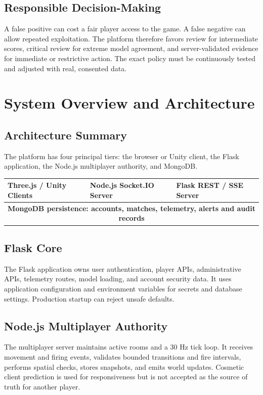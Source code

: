 \documentclass[12pt,a4paper,oneside]{report}
\begin{document}
\section{Responsible Decision-Making}
A false positive can cost a fair player access to the game. A false negative can allow repeated exploitation. The platform therefore favors review for intermediate scores, critical review for extreme model agreement, and server-validated evidence for immediate or restrictive action. The exact policy must be continuously tested and adjusted with real, consented data.

\chapter{System Overview and Architecture}
\section{Architecture Summary}
The platform has four principal tiers: the browser or Unity client, the Flask application, the Node.js multiplayer authority, and MongoDB.

\begin{center}
\begin{tabular}{|p{48mm}|p{48mm}|p{48mm}|}
\hline
\centering\textbf{Three.js / Unity Clients} &
\centering\textbf{Node.js Socket.IO Server} &
\centering\textbf{Flask REST / SSE Server}\\
\hline
\multicolumn{3}{|c|}{\textbf{MongoDB persistence: accounts, matches, telemetry, alerts and audit records}}\\
\hline
\end{tabular}
\end{center}

\section{Flask Core}
The Flask application owns user authentication, player APIs, administrative APIs, telemetry routes, model loading, and account security data. It uses application configuration and environment variables for secrets and database settings. Production startup can reject unsafe defaults.

\section{Node.js Multiplayer Authority}
The multiplayer server maintains active rooms and a 30 Hz tick loop. It receives movement and firing events, validates bounded transitions and fire intervals, performs spatial checks, stores snapshots, and emits world updates. Cosmetic client prediction is used for responsiveness but is not accepted as the source of truth for another player.
\end{document}
